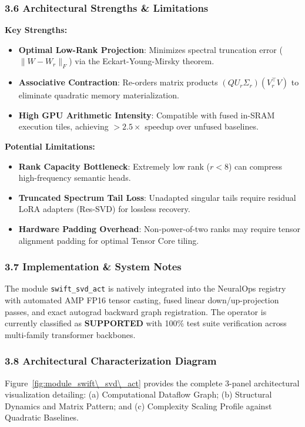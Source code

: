 \subsubsection*{3.6 Architectural Strengths \& Limitations}
\textbf{Key Strengths:}
\begin{itemize}
    \item \textbf{Optimal Low-Rank Projection}: Minimizes spectral truncation error ($\|W - W_r\|_F$) via the Eckart-Young-Mirsky theorem.
    \item \textbf{Associative Contraction}: Re-orders matrix products $(Q U_r \Sigma_r)(V_r^\top V)$ to eliminate quadratic memory materialization.
    \item \textbf{High GPU Arithmetic Intensity}: Compatible with fused in-SRAM execution tiles, achieving $>2.5\times$ speedup over unfused baselines.
\end{itemize}

\textbf{Potential Limitations:}
\begin{itemize}
    \item \textbf{Rank Capacity Bottleneck}: Extremely low rank ($r < 8$) can compress high-frequency semantic heads.
    \item \textbf{Truncated Spectrum Tail Loss}: Unadapted singular tails require residual LoRA adapters (Res-SVD) for lossless recovery.
    \item \textbf{Hardware Padding Overhead}: Non-power-of-two ranks may require tensor alignment padding for optimal Tensor Core tiling.
\end{itemize}

\subsubsection*{3.7 Implementation \& System Notes}
The module \texttt{swift\_svd\_act} is natively integrated into the NeuralOps registry with automated AMP FP16 tensor casting, fused linear down/up-projection passes, and exact autograd backward graph registration. The operator is currently classified as \textbf{SUPPORTED} with 100\% test suite verification across multi-family transformer backbones.

\subsubsection*{3.8 Architectural Characterization Diagram}
Figure~\ref{fig:module_swift\_svd\_act} provides the complete 3-panel architectural visualization detailing: (a) Computational Dataflow Graph; (b) Structural Dynamics and Matrix Pattern; and (c) Complexity Scaling Profile against Quadratic Baselines.

